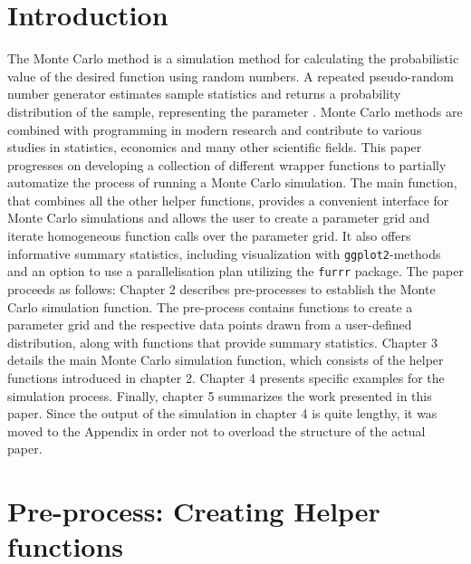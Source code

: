 \documentclass[11pt,a4paper]{article}
\begin{document}
\restoregeometry


{
\hypersetup{linkcolor=black}
\setcounter{tocdepth}{3}
\tableofcontents
}
\newpage
\listoftables
\newpage
\listoffigures
\newpage
{} 
\hypertarget{introduction}{%
\section{Introduction}\label{introduction}}

The Monte Carlo method is a simulation method for calculating the
probabilistic value of the desired function using random numbers. A
repeated pseudo-random number generator estimates sample statistics and
returns a probability distribution of the sample, representing the
parameter \autocite{Barbu_2020}. Monte Carlo methods are combined with
programming in modern research and contribute to various studies in
statistics, economics and many other scientific fields. This paper
progresses on developing a collection of different wrapper functions to
partially automatize the process of running a Monte Carlo simulation.
The main function, that combines all the other helper functions,
provides a convenient interface for Monte Carlo simulations and allows
the user to create a parameter grid and iterate homogeneous function
calls over the parameter grid. It also offers informative summary
statistics, including visualization with \texttt{ggplot2}-methods and an
option to use a parallelisation plan utilizing the \texttt{furrr}
package. The paper proceeds as follows: Chapter 2 describes
pre-processes to establish the Monte Carlo simulation function. The
pre-process contains functions to create a parameter grid and the
respective data points drawn from a user-defined distribution, along
with functions that provide summary statistics. Chapter 3 details the
main Monte Carlo simulation function, which consists of the helper
functions introduced in chapter 2. Chapter 4 presents specific examples
for the simulation process. Finally, chapter 5 summarizes the work
presented in this paper. Since the output of the simulation in chapter 4
is quite lengthy, it was moved to the Appendix in order not to overload
the structure of the actual paper.

\hypertarget{pre-process-creating-helper-functions}{%
\section{Pre-process: Creating Helper
functions}\label{pre-process-creating-helper-functions}}
\end{document}
